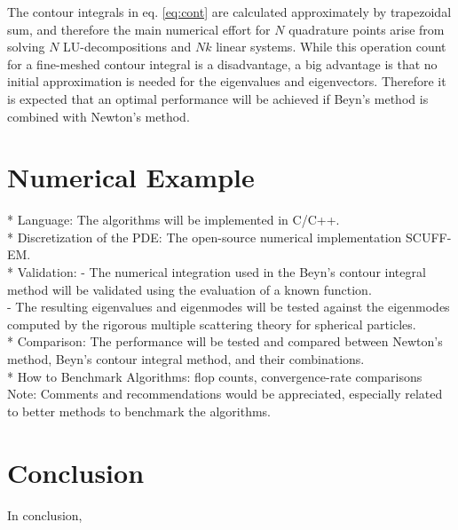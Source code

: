 \documentclass[11pt,letterpaper]{article}
\begin{document}
\begin{multicols}{2}
The contour integrals in eq. \ref{eq:cont} are calculated approximately by trapezoidal sum, and therefore the main numerical effort for $N$ quadrature points arise from solving $N$ LU-decompositions and $Nk$ linear systems. While this operation count for a fine-meshed contour integral is a disadvantage, a big advantage is that no initial approximation is needed for the eigenvalues and eigenvectors. Therefore it is expected that an optimal performance will be achieved if Beyn's method is combined with Newton's method. 
\section{Numerical Example}
* Language: The algorithms will be implemented in C/C++.\\
* Discretization of the PDE: The open-source numerical implementation SCUFF-EM.\citep{SCUFF1}\\
* Validation: 
- The numerical integration used in the Beyn's contour integral method will be validated using the evaluation of a known function. \\
- The resulting eigenvalues and eigenmodes will be tested against the eigenmodes computed by the rigorous multiple scattering theory for spherical particles. \citep{xu1995electromagnetic}\\
* Comparison: The performance will be tested and compared between Newton's method, Beyn's contour integral method, and their combinations.  \\
* How to Benchmark Algorithms: flop counts, convergence-rate comparisons\\
Note: Comments and recommendations would be appreciated, especially related to better methods to benchmark the algorithms.  

\section{Conclusion}
In conclusion, 


\end{multicols}
\end{document}

